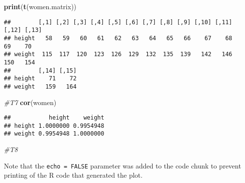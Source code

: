 \documentclass[
]{article}
\newenvironment{Shaded}{\begin{snugshade}}{\end{snugshade}}
\newcommand{\CommentTok}[1]{\textcolor[rgb]{0.56,0.35,0.01}{\textit{#1}}}
\newcommand{\FunctionTok}[1]{\textcolor[rgb]{0.13,0.29,0.53}{\textbf{#1}}}
\newcommand{\NormalTok}[1]{#1}
\begin{document}
\begin{Shaded}
\begin{Highlighting}[]
\FunctionTok{print}\NormalTok{(}\FunctionTok{t}\NormalTok{(women.matrix))}
\end{Highlighting}
\end{Shaded}

\begin{verbatim}
##        [,1] [,2] [,3] [,4] [,5] [,6] [,7] [,8] [,9] [,10] [,11] [,12] [,13]
## height   58   59   60   61   62   63   64   65   66    67    68    69    70
## weight  115  117  120  123  126  129  132  135  139   142   146   150   154
##        [,14] [,15]
## height    71    72
## weight   159   164
\end{verbatim}

\begin{Shaded}
\begin{Highlighting}[]
\CommentTok{\#T7}
\FunctionTok{cor}\NormalTok{(women)}
\end{Highlighting}
\end{Shaded}

\begin{verbatim}
##           height    weight
## height 1.0000000 0.9954948
## weight 0.9954948 1.0000000
\end{verbatim}

\begin{Shaded}
\begin{Highlighting}[]
\CommentTok{\#T8}
\end{Highlighting}
\end{Shaded}

Note that the \texttt{echo\ =\ FALSE} parameter was added to the code
chunk to prevent printing of the R code that generated the plot.
\end{document}
